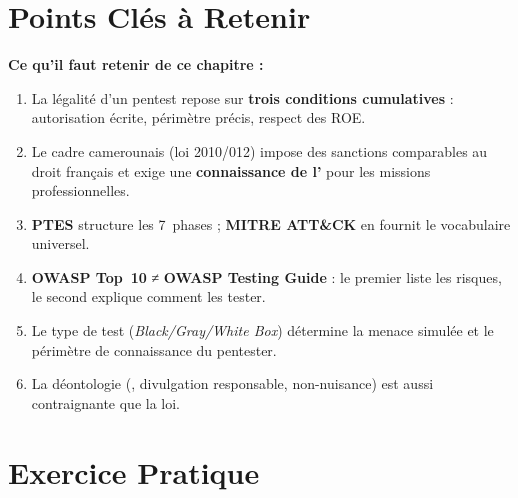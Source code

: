 \section*{Points Clés à Retenir}

\begin{boxinfo}
\textbf{Ce qu'il faut retenir de ce chapitre :}
\begin{enumerate}
    \item La légalité d'un pentest repose sur \textbf{trois conditions
          cumulatives} : autorisation écrite, périmètre précis, respect
          des ROE.
    \item Le cadre camerounais (loi 2010/012) impose des sanctions comparables
          au droit français et exige une \textbf{connaissance de l'}
          pour les missions professionnelles.
    \item \textbf{PTES} structure les 7~phases ; \textbf{MITRE ATT\&CK} en
          fournit le vocabulaire universel.
    \item \textbf{OWASP Top~10} ≠ \textbf{OWASP Testing Guide} : le premier
          liste les risques, le second explique comment les tester.
    \item Le type de test (\textit{Black/Gray/White Box}) détermine la menace
          simulée et le périmètre de connaissance du pentester.
    \item La déontologie (, divulgation responsable,
          non-nuisance) est aussi contraignante que la loi.
\end{enumerate}
\end{boxinfo}

\section*{Exercice Pratique}

